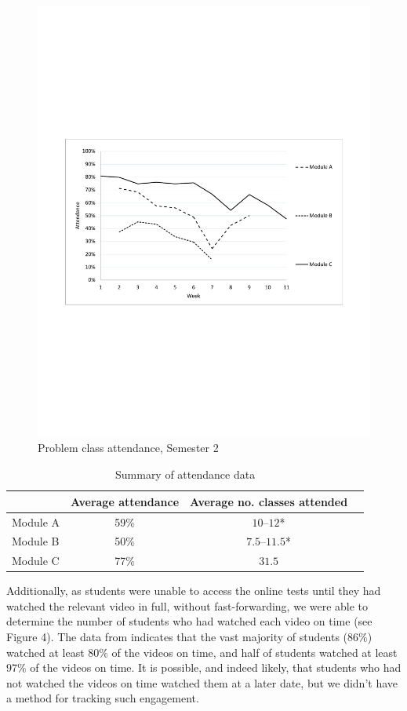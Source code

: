 \documentclass{amsart}
\begin{document}
\begin{center}
\begin{figure}[hbt]
\includegraphics[bb=50 250 562 545,width=1\textwidth]{figure3.pdf}
\caption{Problem class attendance, Semester 2}
\end{figure}
\end{center}
  
\begin{table}[htb]
\begin{tabular}{lccc}
& Average attendance & Average no. classes attended\\\hline
Module A & 59\% & $10$--$12$*\\
Module B & 50\% & $7.5$--$11.5$*\\
Module C & 77\% & $31.5$
\end{tabular}
\caption{Summary of attendance data}
\end{table}

Additionally, as students were unable to access the online tests until they had watched the relevant video in full, without fast-forwarding, we were able to determine the number of students who had watched each video on time (see Figure 4).  The data from indicates that the vast majority of students (86\%) watched at least $80\%$ of the videos on time, and half of students watched at least $97\%$ of the videos on time.  It is possible, and indeed likely, that students who had not watched the videos on time watched them at a later date, but we didn't have a method for tracking such engagement.
\end{document}
